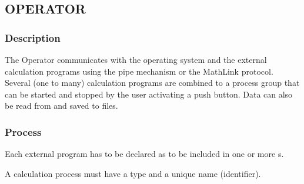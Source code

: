 \newpage
\subsection{OPERATOR}
\label{sec:operator}
\subsubsection{Description}
\label{sec:opdescription}
The Operator communicates with the operating system and the
  external calculation programs using the pipe mechanism or the
  MathLink  protocol. Several (one to many) calculation programs
  are combined to a process group that can be started and stopped
  by the user activating a push button. Data can also be read from
  and saved to files.




\subsubsection{Process}
\label{sec:opprocess}
Each external program has to be declared as \PROCESS{} to be included in one or more \PROCESSGROUP s.




A calculation process must have a type and a unique name (identifier).
\vspace{0.5cm}

